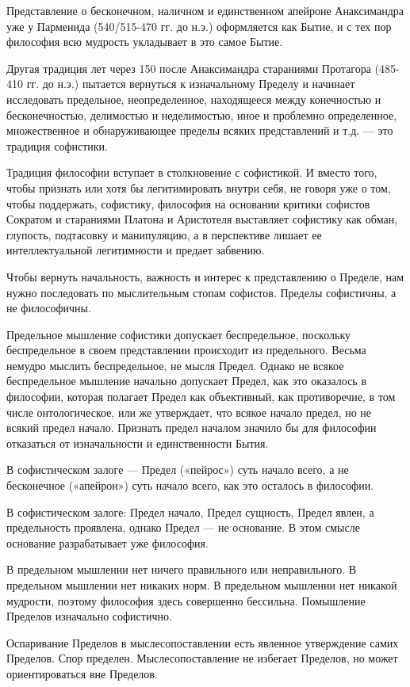 Представление о бесконечном, наличном и единственном апейроне Анаксимандра уже
у Парменида (540/515-470 гг. до н.э.) оформляется как Бытие, и с тех пор
философия всю мудрость укладывает в это самое Бытие.

Другая традиция лет через 150 после Анаксимандра стараниями Протагора (485-410
гг. до н.э.) пытается вернуться к изначальному Пределу и начинает исследовать
предельное, неопределенное, находящееся между конечностью и бесконечностью,
делимостью и неделимостью, иное и проблемно определенное, множественное и
обнаруживающее пределы всяких представлений и т.д. — это традиция софистики.

Традиция философии вступает в столкновение с софистикой. И вместо того, чтобы
признать или хотя бы легитимировать внутри себя, не говоря уже о том, чтобы
поддержать, софистику, философия на основании критики софистов Сократом и
стараниями Платона и Аристотеля выставляет софистику как обман, глупость,
подтасовку и манипуляцию, а в перспективе лишает ее интеллектуальной
легитимности и предает забвению.

Чтобы вернуть начальность, важность и интерес к представлению о Пределе, нам
нужно последовать по мыслительным стопам софистов. Пределы софистичны, а не
философичны.

Предельное мышление софистики допускает беспредельное, поскольку беспредельное
в своем представлении происходит из предельного. Весьма немудро мыслить
беспредельное, не мысля Предел. Однако не всякое беспредельное мышление
начально допускает Предел, как это оказалось в философии, которая полагает
Предел как объективный, как противоречие, в том числе онтологическое, или же
утверждает, что всякое начало предел, но не всякий предел начало. Признать
предел началом значило бы для философии отказаться от изначальности и
единственности Бытия.

В софистическом залоге — Предел («пейрос») суть начало всего, а не бесконечное
(«апейрон») суть начало всего, как это осталось в философии.

В софистическом залоге: Предел начало, Предел сущность, Предел явлен, а
предельность проявлена, однако Предел — не основание. В этом смысле основание
разрабатывает уже философия.

В предельном мышлении нет ничего правильного или неправильного. В предельном
мышлении нет никаких норм. В предельном мышлении нет никакой мудрости, поэтому
философия здесь совершенно бессильна. Помышление Пределов изначально
софистично.

Оспаривание Пределов в мыслесопоставлении есть явленное утверждение самих
Пределов. Спор пределен. Мыслесопоставление не избегает Пределов, но может
ориентироваться вне Пределов.

